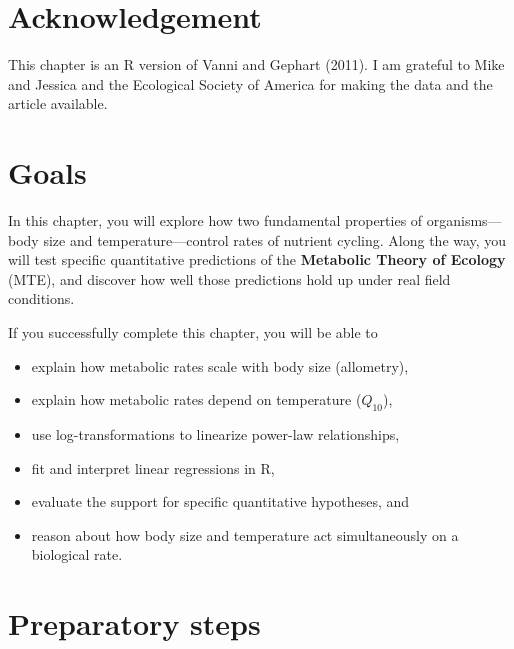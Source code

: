 \documentclass[
  letterpaper,
  DIV=11,
  numbers=noendperiod]{scrreprt}
\providecommand{\tightlist}{%
  \setlength{\itemsep}{0pt}\setlength{\parskip}{0pt}}
\begin{document}
\section{Acknowledgement}\label{acknowledgement}

This chapter is an R version of Vanni and Gephart (2011). I am grateful
to Mike and Jessica and the Ecological Society of America for making the
data and the article available.

\section{Goals}\label{goals-11}

In this chapter, you will explore how two fundamental properties of
organisms---body size and temperature---control rates of nutrient
cycling. Along the way, you will test specific quantitative predictions
of the \textbf{Metabolic Theory of Ecology} (MTE), and discover how well
those predictions hold up under real field conditions.

If you successfully complete this chapter, you will be able to

\begin{itemize}
\tightlist
\item
  explain how metabolic rates scale with body size (allometry),
\item
  explain how metabolic rates depend on temperature (\(Q_{10}\)),
\item
  use log-transformations to linearize power-law relationships,
\item
  fit and interpret linear regressions in R,
\item
  evaluate the support for specific quantitative hypotheses, and
\item
  reason about how body size and temperature act simultaneously on a
  biological rate.
\end{itemize}

\section{Preparatory steps}\label{preparatory-steps-8}
\end{document}

